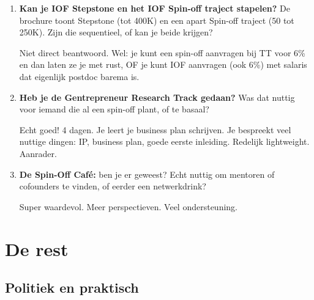 \documentclass[11pt,a4paper]{article}
\newcommand{\filledbox}[1]{%
\begin{tcolorbox}[colback=notebg, colframe=noteborder, boxrule=0.5pt, arc=2pt, left=4pt, right=4pt, top=2pt, bottom=2pt]
#1
\end{tcolorbox}
}
\begin{document}
\begin{enumerate}[resume]

\item \textbf{Kan je IOF Stepstone en het IOF Spin-off traject stapelen?} De brochure toont Stepstone (tot 400K) en een apart Spin-off traject (50 tot 250K). Zijn die sequentieel, of kan je beide krijgen?

\filledbox{Niet direct beantwoord. Wel: je kunt een spin-off aanvragen bij TT voor 6\% en dan laten ze je met rust, OF je kunt IOF aanvragen (ook 6\%) met salaris dat eigenlijk postdoc barema is.}

\item \textbf{Heb je de Gentrepreneur Research Track gedaan?} Was dat nuttig voor iemand die al een spin-off plant, of te basaal?

\filledbox{Echt goed! 4 dagen. Je leert je business plan schrijven. Je bespreekt veel nuttige dingen: IP, business plan, goede eerste inleiding. Redelijk lightweight. Aanrader.}

\item \textbf{De Spin-Off Caf\'e:} ben je er geweest? Echt nuttig om mentoren of cofounders te vinden, of eerder een netwerkdrink?

\filledbox{Super waardevol. Meer perspectieven. Veel ondersteuning.}

\end{enumerate}

\section{De rest}

\subsection{Politiek en praktisch}
\end{document}
